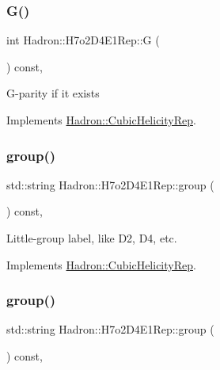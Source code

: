 \subsubsection{\texorpdfstring{G()}{G()}\hspace{0.1cm}{\footnotesize\ttfamily [3/3]}}
{\footnotesize\ttfamily int Hadron\+::\+H7o2\+D4\+E1\+Rep\+::G (\begin{DoxyParamCaption}{ }\end{DoxyParamCaption}) const\hspace{0.3cm}{\ttfamily [inline]}, {\ttfamily [virtual]}}

G-\/parity if it exists 

Implements \mbox{\hyperlink{structHadron_1_1CubicHelicityRep_a50689f42be1e6170aa8cf6ad0597018b}{Hadron\+::\+Cubic\+Helicity\+Rep}}.

\mbox{\label{structHadron_1_1H7o2D4E1Rep_ad2f4770cf61bbb361907c5347106cf14}} 
\subsubsection{\texorpdfstring{group()}{group()}\hspace{0.1cm}{\footnotesize\ttfamily [1/5]}}
{\footnotesize\ttfamily std\+::string Hadron\+::\+H7o2\+D4\+E1\+Rep\+::group (\begin{DoxyParamCaption}{ }\end{DoxyParamCaption}) const\hspace{0.3cm}{\ttfamily [inline]}, {\ttfamily [virtual]}}

Little-\/group label, like D2, D4, etc. 

Implements \mbox{\hyperlink{structHadron_1_1CubicHelicityRep_a101a7d76cd8ccdad0f272db44b766113}{Hadron\+::\+Cubic\+Helicity\+Rep}}.

\mbox{\label{structHadron_1_1H7o2D4E1Rep_ad2f4770cf61bbb361907c5347106cf14}} 
\subsubsection{\texorpdfstring{group()}{group()}\hspace{0.1cm}{\footnotesize\ttfamily [2/5]}}
{\footnotesize\ttfamily std\+::string Hadron\+::\+H7o2\+D4\+E1\+Rep\+::group (\begin{DoxyParamCaption}{ }\end{DoxyParamCaption}) const\hspace{0.3cm}{\ttfamily [inline]}, {\ttfamily [virtual]}}

